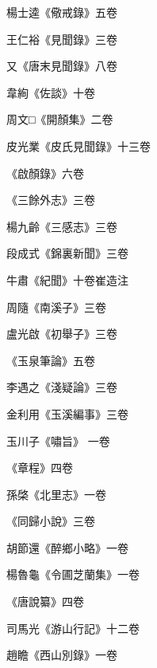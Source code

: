 \begin{pinyinscope}
 楊士逵《儆戒錄》五卷



 王仁裕《見聞錄》三卷



 又《唐末見聞錄》八卷



 韋絢《佐談》十卷



 周文□《開顏集》二卷



 皮光業《皮氏見聞錄》十三卷



 《啟顏錄》六卷



 《三餘外志》三卷



 楊九齡《三感志》三卷



 段成式《錦裏新聞》三卷



 牛肅《紀聞》十卷崔造注



 周隨《南溪子》三卷



 盧光啟《初舉子》三卷



 《玉泉筆論》五卷



 李遇之《淺疑論》三卷



 金利用《玉溪編事》三卷



 玉川子《嘯旨》
 一卷



 《章程》四卷



 孫棨《北里志》一卷



 《同歸小說》三卷



 胡節還《醉鄉小略》一卷



 楊魯龜《令圃芝蘭集》一卷



 《唐說纂》四卷



 司馬光《游山行記》十二卷



 趙瞻《西山別錄》一卷




\end{pinyinscope}

